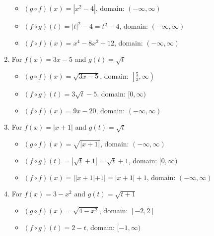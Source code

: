 \begin{enumerate}
\begin{itemize}

\item  $(g \circ f)(x) = |x^2-4|$, domain: $(-\infty, \infty)$

\item  $(f \circ g)(t) =|t|^2-4 = t^2-4$, domain: $(-\infty, \infty)$

\item  $(f \circ f)(x) =x^4-8x^2+12$, domain: $(-\infty, \infty)$

\end{itemize}

\item For   $f(x) = 3x-5$ and $g(t) = \sqrt{t}$ 

\begin{itemize}

\item  $(g \circ f)(x) = \sqrt{3x-5}$, domain: $\left[ \frac{5}{3}, \infty \right)$

\item  $(f \circ g)(t) = 3\sqrt{t}-5$, domain: $[0,\infty)$

\item  $(f \circ f)(x) = 9x-20$, domain: $(-\infty, \infty)$

\end{itemize}


\item For   $f(x) = |x+1|$ and $g(t) = \sqrt{t}$

\begin{itemize}

\item  $(g \circ f)(x) = \sqrt{|x+1|}$, domain: $(-\infty, \infty)$

\item  $(f \circ g)(t) = |\sqrt{t}+1| = \sqrt{t}+1$, domain: $[0,\infty)$

\item  $(f \circ f)(x) = ||x+1|+1| = |x+1|+1$, domain: $(-\infty, \infty)$

\end{itemize}


\item For   $f(x) = 3-x^2$ and $g(t) = \sqrt{t+1}$ 

\begin{itemize}

\item  $(g \circ f)(x) = \sqrt{4-x^2}$, domain: $[-2,2]$

\item  $(f \circ g)(t) =2-t$, domain: $[-1, \infty)$


\end{itemize}
\end{enumerate}

